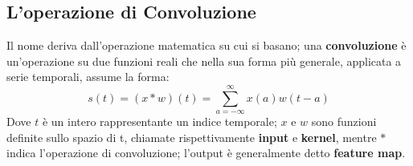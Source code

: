 \documentclass[12pt,a4paper]{report}
\begin{document}
    \subsection{L'operazione di Convoluzione}
    Il nome deriva dall'operazione matematica su cui si basano; una
    \textbf{convoluzione} \`e un'operazione su due funzioni reali
    che nella sua forma pi\`u generale, applicata a serie 
    temporali, assume la forma: 
    \begin{equation}
    s(t) = (x*w)(t)=\sum\limits_{a=-\infty}^\infty x(a)w(t-a)
    \end{equation}
    Dove $t$ \`e un intero rappresentante un indice temporale; $x$
    e $w$ sono funzioni definite sullo spazio di t, chiamate 
    rispettivamente \textbf{input} e \textbf{kernel}, mentre $*$ 
    indica l'operazione di convoluzione; l'output \`e generalmente
    detto \textbf{feature map}.
\end{document}
